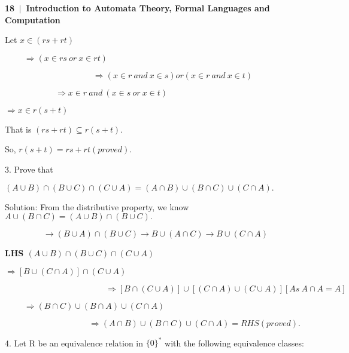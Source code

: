 \documentclass[10pt,a4paper]{article}
\begin{document}
\scriptsize

\begin{flushleft}
\textsf{\textbf{  18\, $|$ \,Introduction to Automata Theory, Formal Languages and Computation}}
\end{flushleft}

Let $x \in (rs + rt)$

\begin{center}
  $\qquad\;\Longrightarrow (x \in rs \:or\: x \in rt)$

  $\qquad\qquad\qquad\qquad\qquad\:\;\Longrightarrow (x \in r \:and\: x \in s) or (x \in r \:and\: x \in t)$

  $\qquad\qquad\qquad\Longrightarrow x \in r \:and\: (x \in s \:or\: x \in t)$

  $\Longrightarrow x \in r(s + t)$
\end{center}

That is $(rs + rt) \subseteq r(s + t)$.

\qquad So, $r(s + t) = rs + rt (proved)$.

\begin{flushleft}
3. Prove that
\end{flushleft}

$(A \cup B) \cap (B \cup C) \cap (C \cup A) = (A \cap B) \cup (B \cap C) \cup (C \cap A).$

Solution: From the distributive property, we know $A \cup (B \cap C) = (A \cup B) \cap (B \cup C).$

$$\longrightarrow (B \cup A) \cap (B \cup C) \rightarrow B \cup (A \cap C) \rightarrow B \cup (C \cap A)$$

\textbf{LHS $(A \cup B) \cap (B \cup C) \cap (C \cup A)$}

\begin{center}
  $\Longrightarrow [B \cup (C \cap A)] \cap (C \cup A)$

  $\qquad\qquad\qquad\qquad\qquad\qquad\Longrightarrow [B \cap (C \cup A)] \cup [(C \cap A) \cup(C \cup A)] [As\: A \cap A = A]$

  $\qquad\;\Longrightarrow (B \cap C) \cup(B \cap A) \cup (C \cap A)$

  $\qquad\qquad\qquad\qquad\qquad\Longrightarrow (A \cap B) \cup (B \cap C) \cup (C \cap A) = RHS (proved).$
\end{center}

\begin{flushleft}
  4. Let R be an equivalence relation in $\{0\}^{*}$ with the following equivalence classes:
\end{flushleft}
\end{document}
